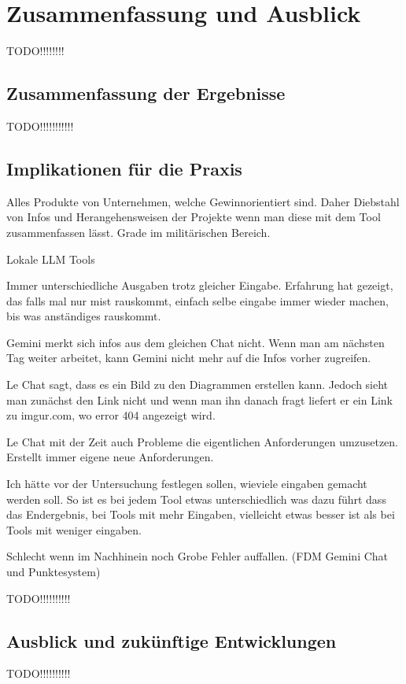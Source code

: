 
\chapter{Zusammenfassung und Ausblick} 

TODO!!!!!!!!

\section{Zusammenfassung der Ergebnisse}  \label{Zusammenfassung der Ergebnisse}

TODO!!!!!!!!!!!

\section{Implikationen für die Praxis}  \label{Implikationen für die Praxis}

Alles Produkte von Unternehmen, welche Gewinnorientiert sind. Daher Diebstahl von Infos und Herangehensweisen der Projekte 
wenn man diese mit dem Tool zusammenfassen lässt. Grade im militärischen Bereich.

Lokale LLM Tools

Immer unterschiedliche Ausgaben trotz gleicher Eingabe. Erfahrung hat gezeigt, das falls mal nur mist rauskommt, einfach selbe eingabe 
immer wieder machen, bis was anständiges rauskommt.

Gemini merkt sich infos aus dem gleichen Chat nicht. Wenn man am nächsten Tag weiter arbeitet, kann Gemini nicht mehr auf die Infos vorher 
zugreifen.

Le Chat sagt, dass es ein Bild zu den Diagrammen erstellen kann. Jedoch sieht man zunächst den Link nicht und wenn man ihn danach fragt 
liefert er ein Link zu imgur.com, wo error 404 angezeigt wird.

Le Chat mit der Zeit auch Probleme die eigentlichen Anforderungen umzusetzen. Erstellt immer eigene neue Anforderungen.

Ich hätte vor der Untersuchung festlegen sollen, wieviele eingaben gemacht werden soll. So ist es bei jedem Tool etwas unterschiedlich
was dazu führt dass das Endergebnis, bei Tools mit mehr Eingaben, vielleicht etwas besser ist als bei Tools mit weniger eingaben.

Schlecht wenn im Nachhinein noch Grobe Fehler auffallen. (FDM Gemini Chat und Punktesystem)

TODO!!!!!!!!!!

\section{Ausblick und zukünftige Entwicklungen}  \label{Ausblick und zukünftige Entwicklungen}

TODO!!!!!!!!!!